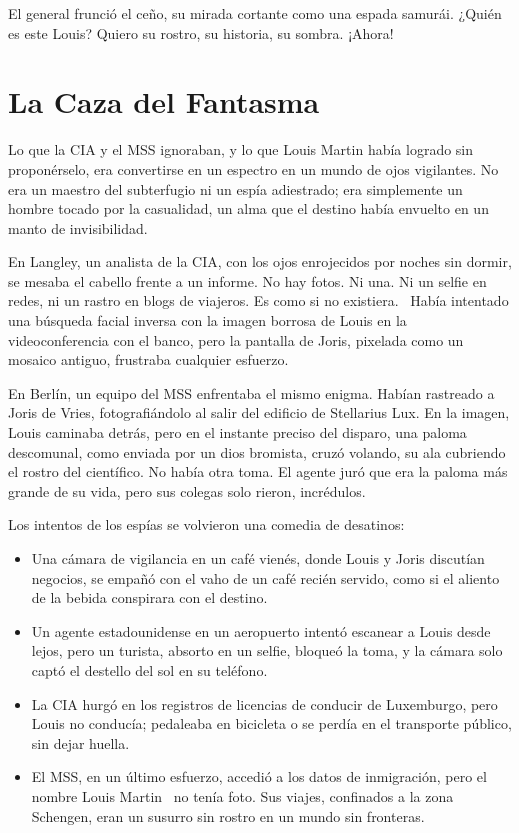 El general frunció el ceño, su mirada cortante como una espada samurái. \glqq ¿Quién es este Louis? Quiero su rostro, su historia, su sombra. ¡Ahora!\grqq

\section{La Caza del Fantasma}

Lo que la CIA y el MSS ignoraban, y lo que Louis Martin había logrado sin proponérselo, era convertirse en un espectro en un mundo de ojos vigilantes. No era un maestro del subterfugio ni un espía adiestrado; era simplemente un hombre tocado por la casualidad, un alma que el destino había envuelto en un manto de invisibilidad.

En Langley, un analista de la CIA, con los ojos enrojecidos por noches sin dormir, se mesaba el cabello frente a un informe. \glqq No hay fotos. Ni una. Ni un selfie en redes, ni un rastro en blogs de viajeros. Es como si no existiera.\grqq~ Había intentado una búsqueda facial inversa con la imagen borrosa de Louis en la videoconferencia con el banco, pero la pantalla de Joris, pixelada como un mosaico antiguo, frustraba cualquier esfuerzo.

En Berlín, un equipo del MSS enfrentaba el mismo enigma. Habían rastreado a Joris de Vries, fotografiándolo al salir del edificio de Stellarius Lux. En la imagen, Louis caminaba detrás, pero en el instante preciso del disparo, una paloma descomunal, como enviada por un dios bromista, cruzó volando, su ala cubriendo el rostro del científico. No había otra toma. El agente juró que era la paloma más grande de su vida, pero sus colegas solo rieron, incrédulos.

Los intentos de los espías se volvieron una comedia de desatinos:

\begin{itemize}
    \item Una cámara de vigilancia en un café vienés, donde Louis y Joris discutían negocios, se empañó con el vaho de un café recién servido, como si el aliento de la bebida conspirara con el destino.
    \item Un agente estadounidense en un aeropuerto intentó escanear a Louis desde lejos, pero un turista, absorto en un selfie, bloqueó la toma, y la cámara solo captó el destello del sol en su teléfono.
    \item La CIA hurgó en los registros de licencias de conducir de Luxemburgo, pero Louis no conducía; pedaleaba en bicicleta o se perdía en el transporte público, sin dejar huella.
    \item El MSS, en un último esfuerzo, accedió a los datos de inmigración, pero el nombre \glqq Louis Martin\grqq~ no tenía foto. Sus viajes, confinados a la zona Schengen, eran un susurro sin rostro en un mundo sin fronteras.
\end{itemize}

